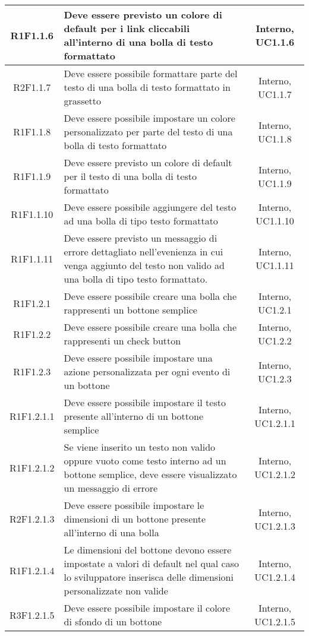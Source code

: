 \begin{longtable}{|c|>{\centering}m{7cm}|c|}
			\hline
			R1F1.1.6 & Deve essere previsto un colore di default per i link cliccabili all'interno di una bolla di testo formattato & Interno, UC1.1.6 \\
			\hline
			R2F1.1.7 & Deve essere possibile formattare parte del testo di una bolla di testo formattato in grassetto & Interno, UC1.1.7 \\
			\hline
			R1F1.1.8 & Deve essere possibile impostare un colore personalizzato per parte del testo di una bolla di testo formattato & Interno, UC1.1.8 \\
			\hline
			R1F1.1.9 & Deve essere previsto un colore di default per il testo di una bolla di testo formattato & Interno, UC1.1.9 \\
			\hline
			R1F1.1.10 & Deve essere possibile aggiungere del testo ad una bolla di tipo testo formattato & Interno, UC1.1.10 \\
			\hline
			R1F1.1.11 & Deve essere previsto un messaggio di errore dettagliato nell'evenienza in cui venga aggiunto del testo non valido ad una bolla di tipo testo formattato.	& Interno, UC1.1.11 \\
			\hline
			R1F1.2.1 & Deve essere possibile creare una bolla che rappresenti un bottone semplice & Interno, UC1.2.1 \\
			\hline
			R1F1.2.2 & Deve essere possibile creare una bolla che rappresenti un check button & Interno, UC1.2.2 \\
			\hline
			R1F1.2.3 & Deve essere possibile impostare una azione personalizzata per ogni evento di un bottone & Interno, UC1.2.3 \\
			\hline
			R1F1.2.1.1 & Deve essere possibile impostare il testo presente all'interno di un bottone semplice & Interno, UC1.2.1.1 \\
			\hline
			R1F1.2.1.2 & Se viene inserito un testo non valido oppure vuoto come testo interno ad un bottone semplice, deve essere visualizzato un messaggio di errore & Interno, UC1.2.1.2 \\
			\hline
			R2F1.2.1.3 & Deve essere possibile impostare le dimensioni di un bottone presente all'interno di una bolla & Interno, UC1.2.1.3 \\
			\hline
			R1F1.2.1.4 & Le dimensioni del bottone devono essere impostate a valori di default nel qual caso lo sviluppatore inserisca delle dimensioni personalizzate non valide & Interno, UC1.2.1.4 \\
			\hline
			R3F1.2.1.5 & Deve essere possibile impostare il colore di sfondo di un bottone & Interno, UC1.2.1.5 \\

\end{longtable}
